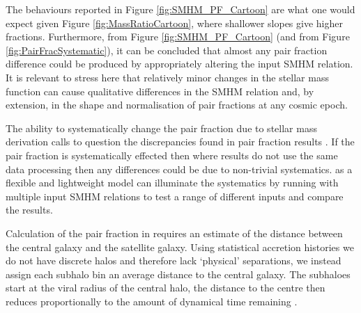 The behaviours reported in Figure \ref{fig:SMHM_PF_Cartoon} are what one would expect given Figure \ref{fig:MassRatioCartoon}, where shallower slopes give higher fractions. 
Furthermore, from Figure \ref{fig:SMHM_PF_Cartoon} (and from Figure \ref{fig:PairFracSystematic}), it can be concluded that almost any pair fraction difference could be produced by appropriately altering the input SMHM relation. 
It is relevant to stress here that relatively minor changes in the stellar mass function can cause qualitative differences in the SMHM relation and, by extension, in the shape and normalisation of pair fractions at any cosmic epoch.

The ability to systematically change the pair fraction due to stellar mass derivation calls to question the discrepancies found in pair fraction results \citep[e.g.][]{Man2016RESOLVING03}. 
If the pair fraction is systematically effected then where results do not use the same data processing then any differences could be due to non-trivial systematics. 
\steel as a flexible and lightweight model can illuminate the systematics by running with multiple input SMHM relations to test a range of different inputs and compare the results.

Calculation of the pair fraction in \steel requires an estimate of the distance between the central galaxy and the satellite galaxy. Using statistical accretion histories we do not have discrete halos and therefore lack `physical' separations, we instead assign each subhalo bin an average distance to the central galaxy. 
The subhaloes start at the viral radius of the central halo, the distance to the centre then reduces proportionally to the amount of dynamical time remaining \citep{Guo2011FromCosmology}.

